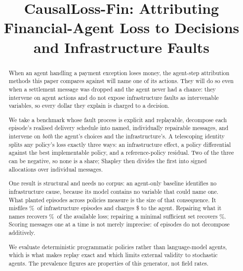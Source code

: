 \documentclass[conference]{IEEEtran}
\begin{document}
\title{CausalLoss-Fin: Attributing Financial-Agent Loss to
Decisions and Infrastructure Faults}

\author{
}

\maketitle

\begin{abstract}
When an agent handling a payment exception loses money, the agent-step
attribution methods this paper compares against will name one of its actions.
They will do so even when a settlement message was dropped and the agent never
had a chance: they intervene on agent actions and do not expose infrastructure
faults as intervenable variables, so every dollar they explain is charged to a
decision.

We take a benchmark whose fault process is explicit and replayable, decompose
each episode's realised delivery schedule into named, individually repairable
messages, and intervene on \emph{both} the agent's choices and the
infrastructure's. A telescoping identity splits any policy's loss exactly three
ways: an infrastructure effect, a policy differential against the best
implementable policy, and a reference-policy residual. Two of the three can be negative, so none is a share; Shapley then divides the
first into signed allocations over individual messages.

One result is structural and needs no corpus: an agent-only baseline identifies
no infrastructure cause, because its model contains no variable that could name
one. What \nPlanted{} planted episodes across \nPolicies{} policies measure is
the size of that consequence. It misfiles \agentOnlyMisattr\%\ of
infrastructure episodes and charges \$\agentOnlyDollars{} to the agent.
Repairing what it names recovers \agentOnlyRepair\%\ of the available loss;
repairing a minimal sufficient set recovers \minSuffRepair\%. Scoring messages
one at a time is not merely imprecise: \nonAdditiveCI{} of episodes do not
decompose additively.

We evaluate deterministic programmatic policies rather than language-model
agents, which is what makes replay exact and which limits external validity to
stochastic agents. The prevalence figures are properties of this generator, not
field rates.
\end{abstract}
\end{document}
